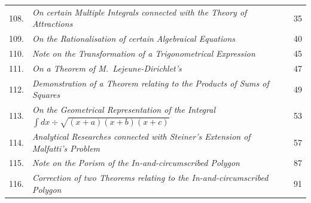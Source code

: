 \documentclass[11pt]{article}
\begin{document}
\begin{longtable}{@{}r p{} r@{}}
108. & \emph{On certain Multiple Integrals connected with the Theory of Attractions} \dotfill \par
\hspace{1em}{\footnotesize Camb.\ and Dubl.\ Math.\ Jour.\ t.\ vii.\ (1852), pp.\ 174---178} & 35 \\
109. & \emph{On the Rationalisation of certain Algebraical Equations} \dotfill \par
\hspace{1em}{\footnotesize Camb.\ and Dubl.\ Math.\ Jour.\ t.\ viii.\ (1853), pp.\ 97---101} & 40 \\
110. & \emph{Note on the Transformation of a Trigonometrical Expression} \dotfill \par
\hspace{1em}{\footnotesize Camb.\ and Dubl.\ Math.\ Jour.\ t.\ ix.\ (1854), pp.\ 61---62} & 45 \\
111. & \emph{On a Theorem of M.\ Lejeune-Dirichlet's} \dotfill \par
\hspace{1em}{\footnotesize Camb.\ and Dubl.\ Math.\ Jour.\ t.\ ix.\ (1854), pp.\ 163---165} & 47 \\
112. & \emph{Demonstration of a Theorem relating to the Products of Sums of Squares} \dotfill \par
\hspace{1em}{\footnotesize Phil.\ Mag.\ t.\ iv.\ (1852), pp.\ 515---519} & 49 \\
113. & \emph{On the Geometrical Representation of the Integral $\int dx \div \sqrt{(x+a)(x+b)(x+c)}$} \dotfill \par
\hspace{1em}{\footnotesize Phil.\ Mag.\ t.\ v.\ (1853), pp.\ 281---284} & 53 \\
114. & \emph{Analytical Researches connected with Steiner's Extension of Malfatti's Problem} \dotfill \par
\hspace{1em}{\footnotesize Phil.\ Trans.\ t.\ cxlii.\ (for 1852), pp.\ 253---278} & 57 \\
115. & \emph{Note on the Porism of the In-and-circumscribed Polygon} \dotfill \par
\hspace{1em}{\footnotesize Phil.\ Mag.\ t.\ vi.\ (1853), pp.\ 99---102} & 87 \\
116. & \emph{Correction of two Theorems relating to the In-and-circumscribed Polygon} \dotfill \par
\hspace{1em}{\footnotesize Phil.\ Mag.\ t.\ vi.\ (1853), pp.\ 376---377} & 91 \\

\end{longtable}
\end{document}
